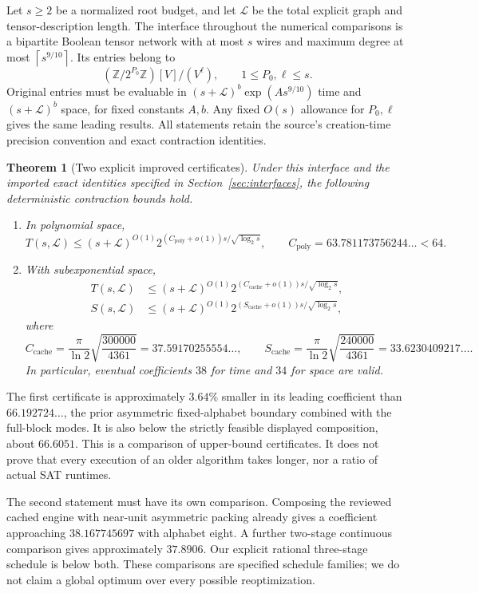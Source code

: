 \documentclass[11pt,letterpaper]{article}
\newtheorem{theorem}{Theorem}[section]
\theoremstyle{remark}\newtheorem{remark}[theorem]{Remark}
\newcommand{\ceil}[1]{\left\lceil#1\right\rceil}
\newcommand{\Z}{\mathbb Z}
\newcommand{\Cnew}{C_{\mathrm{poly}}}
\newcommand{\Ccache}{C_{\mathrm{cache}}}
\newcommand{\Scache}{S_{\mathrm{cache}}}
\begin{document}
Let $s\ge2$ be a normalized root budget, and let $\mathcal L$ be the total
explicit graph and tensor-description length. The interface throughout the
numerical comparisons is a bipartite Boolean tensor network with at most $s$
wires and maximum degree at most $\ceil{s^{9/10}}$. Its entries belong to
\[
 (\Z/2^{P_0}\Z)[V]/(V^\ell),\qquad 1\le P_0,\ell\le s.
\]
Original entries must be evaluable in
$(s+\mathcal L)^b\exp(A s^{9/10})$ time and $(s+\mathcal L)^b$ space,
for fixed constants $A,b$. Any fixed $O(s)$ allowance for $P_0,\ell$ gives
the same leading results. All statements retain the source's creation-time
precision convention and exact contraction identities.

\begin{theorem}[Two explicit improved certificates]\label{thm:main}
Under this interface and the imported exact identities specified in
Section~\ref{sec:interfaces}, the following deterministic contraction bounds hold.
\begin{enumerate}
\item In polynomial space,
\[
 T(s,\mathcal L)\le(s+\mathcal L)^{O(1)}
 2^{(\Cnew+o(1))s/\sqrt{\log_2s}},
 \qquad \Cnew=63.781173756244\ldots<64.
\]
\item With subexponential space,
\begin{align*}
 T(s,\mathcal L)&\le(s+\mathcal L)^{O(1)}
 2^{(\Ccache+o(1))s/\sqrt{\log_2s}},\\
 S(s,\mathcal L)&\le(s+\mathcal L)^{O(1)}
 2^{(\Scache+o(1))s/\sqrt{\log_2s}},
\end{align*}
where
\[
 \Ccache=\frac{\pi}{\ln2}\sqrt{\frac{300000}{4361}}
 =37.59170255554\ldots,
 \qquad
 \Scache=\frac{\pi}{\ln2}\sqrt{\frac{240000}{4361}}
 =33.6230409217\ldots.
\]
In particular, eventual coefficients $38$ for time and $34$ for space are valid.
\end{enumerate}
\end{theorem}

The first certificate is approximately $3.64\%$ smaller in its leading
coefficient than $66.192724\ldots$, the prior asymmetric fixed-alphabet
boundary combined with the full-block modes. It is also below the strictly
feasible displayed composition, about $66.6051$. This is a comparison of
upper-bound certificates. It does not prove that every execution of an older
algorithm takes longer, nor a ratio of actual SAT runtimes.

The second statement must have its own comparison. Composing the reviewed
cached engine with near-unit asymmetric packing already gives a coefficient
approaching $38.167745697$ with alphabet eight. A further two-stage continuous
comparison gives approximately $37.8906$. Our explicit rational three-stage
schedule is below both. These comparisons are specified schedule families;
we do not claim a global optimum over every possible reoptimization.
\end{document}
